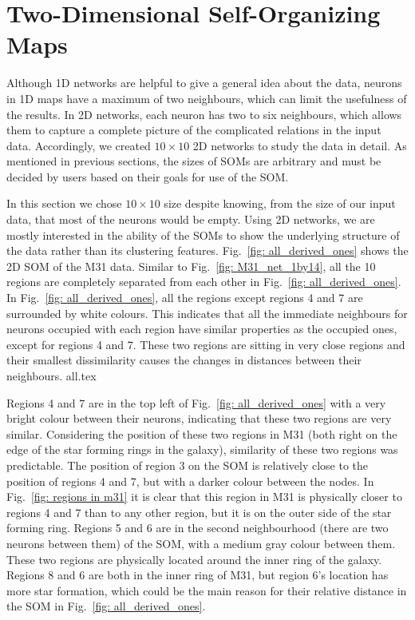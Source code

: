 \section{Two-Dimensional Self-Organizing Maps}
 \label{sec: 2d_cluster}
    Although 1D networks are helpful to give a general idea about the data, neurons in 1D maps have a maximum of two neighbours, which can limit the usefulness of the results.
    In 2D networks, each neuron has two to six neighbours, which allows them to capture a complete picture of the complicated relations in the input data.
    Accordingly, we created $10\times10$ 2D networks to study the data in detail.
    As mentioned in previous sections, the sizes of SOMs are arbitrary and must be decided by users based on their goals for use of the SOM.
    
    In this section we chose $10\times10$ size despite knowing, from the size of our input data, that most of the neurons would be empty.
    Using 2D networks, we are mostly interested in the ability of the SOMs to show the underlying structure of the data rather than its clustering features.
    Fig.~\ref{fig: all_derived_ones} shows the 2D SOM of the M31 data.
    Similar to Fig.~\ref{fig: M31_net_1by14}, all the 10 regions are completely separated from each other in Fig.~\ref{fig: all_derived_ones}.
    In Fig.~\ref{fig: all_derived_ones}, all the regions except regions 4 and 7 are surrounded by white colours.
    This indicates that all the immediate neighbours for neurons occupied with each region have similar properties as the occupied ones, except for regions 4 and 7.
    These two regions are sitting in very close regions and their smallest dissimilarity causes the changes in distances between their neighbours.
    {all.tex}
    
    Regions 4 and 7 are in the top left of Fig.~\ref{fig: all_derived_ones} with a very bright colour between their neurons, indicating that these two regions are very similar.
    Considering the position of these two regions in M31 (both right on the edge of the star forming rings in the galaxy), similarity of these two regions was predictable.
    The position of region 3 on the SOM is relatively close to the position of regions 4 and 7, but with a darker colour between the nodes. 
    In Fig.~\ref{fig: regions in m31} it is clear that this region in M31 is physically closer to regions 4 and 7 than to any other region, but it is on the outer side of the star forming ring.
    Regions 5 and 6 are in the second neighbourhood (there are two neurons between them) of the SOM, with a medium gray colour between them.
    These two regions are physically located around the inner ring of the galaxy.
    Regions 8 and 6 are both in the inner ring of M31, but region 6's location has more star formation, which could be the main reason for their relative distance in the SOM in Fig.~\ref{fig: all_derived_ones}. 
    
